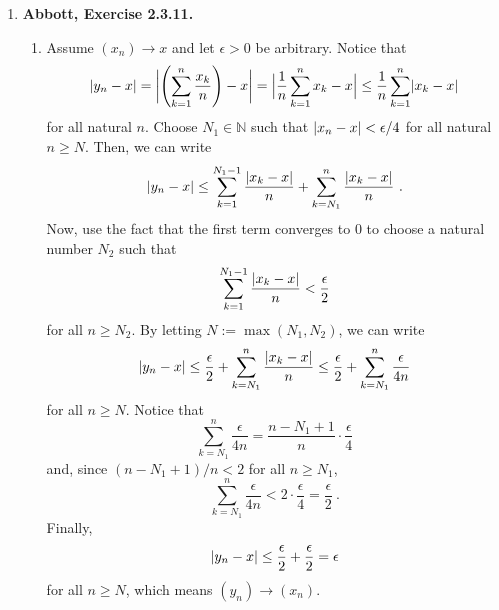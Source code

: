 \documentclass{article}
\DeclarePairedDelimiter\abs{\lvert}{\rvert}
\newcommand{\N}{\mathbb{N}}
\newcommand{\exc}[2][Abbott]{\item \textbf{#1, Exercise #2.}}
\let\oldmax\max
\renewcommand{\max}[1]{\oldmax \left( #1 \right)}
\begin{document}
\begin{enumerate}
	\exc{2.3.11}
	\begin{enumerate}
		\item Assume $(x_n) \rightarrow x$ and let $\epsilon > 0$ be arbitrary. Notice that \begin{equation*}
		      \abs{y_n-x} = \abs[\bigg]{\left (\sum\limits_{k=1}^{n} \frac{x_k}{n}\right)-x} = \abs[\Big]{\frac{1}{n} \sum\limits_{k=1}^{n} x_k-x} \leq \frac{1}{n} \sum\limits_{k=1}^n \abs{x_k-x}
		\end{equation*} for all natural $n$. Choose $N_1 \in \N$ such that $\abs{x_n-x} < \epsilon/4$ for all natural $n \geq N$. Then, we can write \begin{equation*}
		\abs{y_n-x} \leq \sum\limits_{k=1}^{N_1-1} \frac{\abs{x_k-x}}{n} + \sum\limits_{k=N_1}^{n} \frac{\abs{x_k-x}}{n} ~ .
		\end{equation*} Now, use the fact that the first term converges to $0$ to choose a natural number $N_2$ such that \begin{equation*}
		\sum\limits_{k=1}^{N_1-1} \frac{\abs{x_k-x}}{n} < \frac{\epsilon}{2}
		\end{equation*} for all $n \geq N_2$. By letting $N := \max{N_1, N_2}$, we can write \begin{equation*}
		\abs{y_n-x} \leq \frac{\epsilon}{2} + \sum\limits_{k=N_1}^{n} \frac{\abs{x_k-x}}{n} \leq \frac{\epsilon}{2} + \sum\limits_{k=N_1}^{n} \frac{\epsilon}{4n}
		\end{equation*} for all $n \geq N$. Notice that \begin{equation*}
		\sum\limits_{k=N_1}^{n} \frac{\epsilon}{4n} = \frac{n-N_1+1}{n} \cdot \frac{\epsilon}{4}
		\end{equation*} and, since $(n-N_1 + 1) / n < 2$ for all $n \geq N_1$, \begin{equation*}
		\sum\limits_{k=N_1}^{n} \frac{\epsilon}{4n} < 2 \cdot \frac{\epsilon}{4} = \frac{\epsilon}{2} ~.
		\end{equation*} Finally, \begin{equation*}
		\abs{y_n-x} \leq \frac{\epsilon}{2} + \frac{\epsilon}{2} = \epsilon
		\end{equation*} for all $n \geq N$, which means $(y_n) \rightarrow (x_n)$.
							     

\end{enumerate}
\end{enumerate}
\end{document}

